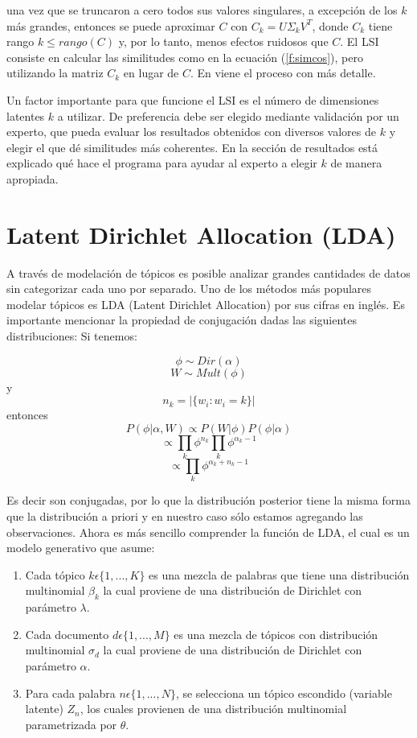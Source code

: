 una vez que se truncaron a cero todos sus valores singulares, a excepción de los $k$ más grandes, 
entonces se puede aproximar $C$ con $C_k = U \Sigma_k V^T$, donde
$C_k$ tiene rango $k \leq rango(C)$ y, por lo tanto, menos
efectos ruidosos que $C$. El LSI consiste en calcular las
similitudes como en la ecuación (\ref{f:simcos}), pero 
utilizando la matriz $C_k$ en lugar de $C$. En \citep{rosario2000} viene el proceso con más detalle.

Un factor importante para que funcione el LSI es el número de dimensiones latentes $k$ a utilizar. 
De preferencia debe ser elegido mediante validación por un
experto, que pueda evaluar los resultados obtenidos con diversos
valores de $k$ y elegir el que dé similitudes más coherentes. 
En la sección de resultados está explicado qué hace el programa para ayudar al experto a elegir $k$ de manera apropiada.


\section{Latent Dirichlet Allocation (LDA)}

A través de modelación de tópicos es posible analizar grandes cantidades
de datos sin categorizar cada uno por separado. Uno de los métodos más populares modelar tópicos es
LDA (Latent Dirichlet Allocation)  por sus cifras en inglés.
Es importante mencionar la propiedad de conjugación dadas las siguientes
distribuciones: Si tenemos:

\[ \phi \sim Dir(\alpha) \] \[ W \sim Mult(\phi) \] y
\[ n_k = |\{w_i:w_i = k \}| \] entonces
\[ P(\phi|\alpha, W) \propto P(W|\phi)P(\phi|\alpha) \]
\[ \propto \prod_k \phi^{n_k} \prod_k \phi^{\alpha_k-1} \]
\[ \propto \prod_k \phi^{\alpha_k+n_k-1} \]

Es decir son conjugadas, por lo que la distribución posterior tiene la
misma forma que la distribución a priori y en nuestro caso sólo estamos
agregando las observaciones. Ahora es más sencillo comprender la función
de LDA, el cual es un modelo generativo que asume:

\begin{enumerate}
  \item Cada tópico $k \epsilon \{1,...,K\}$ es una mezcla de palabras que tiene una distribución multinomial $\beta_k$ la cual proviene de una distribución de Dirichlet con parámetro $\lambda$. 
    \item Cada documento $d \epsilon \{1,...,M\} $ es una mezcla de tópicos con distribución multinomial $\sigma_d$ la cual proviene de una distribución de Dirichlet con parámetro $\alpha$.
    \item Para cada palabra $n \epsilon \{1,...,N\}$, se selecciona un tópico escondido (variable latente) $Z_n$, los cuales provienen de una distribución multinomial parametrizada por $\theta$.
\end{enumerate}


